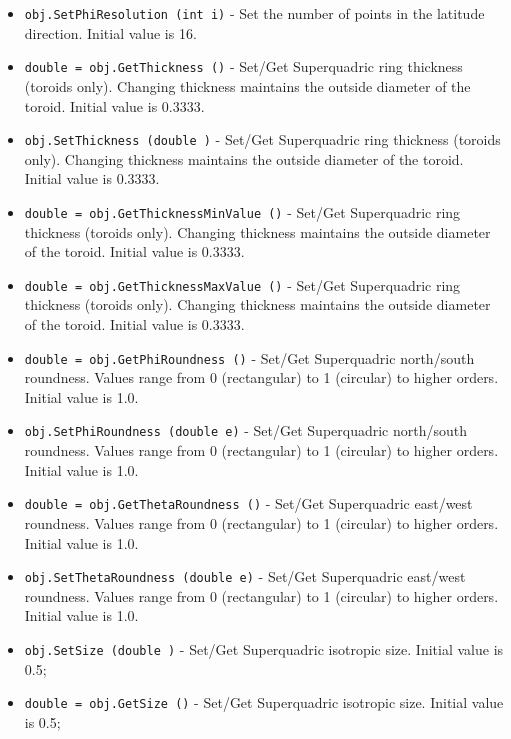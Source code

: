 \begin{itemize}
\item  \verb|obj.SetPhiResolution (int i)| -  Set the number of points in the latitude direction. Initial value is 16.

\item  \verb|double = obj.GetThickness ()| -  Set/Get Superquadric ring thickness (toroids only).
 Changing thickness maintains the outside diameter of the toroid.
 Initial value is 0.3333.

\item  \verb|obj.SetThickness (double )| -  Set/Get Superquadric ring thickness (toroids only).
 Changing thickness maintains the outside diameter of the toroid.
 Initial value is 0.3333.

\item  \verb|double = obj.GetThicknessMinValue ()| -  Set/Get Superquadric ring thickness (toroids only).
 Changing thickness maintains the outside diameter of the toroid.
 Initial value is 0.3333.

\item  \verb|double = obj.GetThicknessMaxValue ()| -  Set/Get Superquadric ring thickness (toroids only).
 Changing thickness maintains the outside diameter of the toroid.
 Initial value is 0.3333.

\item  \verb|double = obj.GetPhiRoundness ()| -  Set/Get Superquadric north/south roundness. 
 Values range from 0 (rectangular) to 1 (circular) to higher orders.
 Initial value is 1.0.

\item  \verb|obj.SetPhiRoundness (double e)| -  Set/Get Superquadric north/south roundness. 
 Values range from 0 (rectangular) to 1 (circular) to higher orders.
 Initial value is 1.0.

\item  \verb|double = obj.GetThetaRoundness ()| -  Set/Get Superquadric east/west roundness.
 Values range from 0 (rectangular) to 1 (circular) to higher orders.
 Initial value is 1.0.

\item  \verb|obj.SetThetaRoundness (double e)| -  Set/Get Superquadric east/west roundness.
 Values range from 0 (rectangular) to 1 (circular) to higher orders.
 Initial value is 1.0.

\item  \verb|obj.SetSize (double )| -  Set/Get Superquadric isotropic size. Initial value is 0.5;

\item  \verb|double = obj.GetSize ()| -  Set/Get Superquadric isotropic size. Initial value is 0.5;


\end{itemize}
